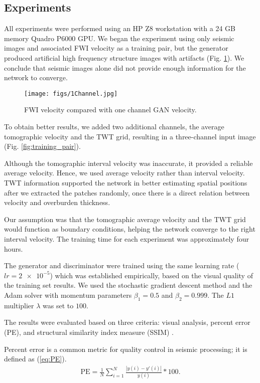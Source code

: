 \documentclass[conference]{IEEEtran}
\begin{document}
\subsection{Experiments}

All experiments were performed using an HP Z8 workstation with a 24 GB memory Quadro P6000 GPU.
We began the experiment using only seismic images and associated FWI velocity as a training pair, but the generator produced artificial high frequency structure images with artifacts (Fig.  \ref{fig:oneChanel}). We conclude that seismic images alone did not provide enough information for the network to converge.

\begin{figure}[b]
 \centering
 \texttt{[image: figs/1Channel.jpg]}
  \caption{FWI velocity compared with one channel GAN velocity.}
 \label{fig:oneChanel}
\end{figure}

To obtain better results, we added two additional channels, the average tomographic velocity and the TWT grid, resulting in a three-channel input image (Fig. \ref{fig:training_pair}).

Although the tomographic interval velocity was inaccurate, it provided a reliable average velocity. Hence, we used average velocity rather than interval velocity. TWT information supported the network in better estimating spatial positions after we extracted the patches randomly, once there is a direct relation between velocity and overburden thickness.

Our assumption was that the tomographic average velocity and the TWT grid would function as boundary conditions, helping the network converge to the right interval velocity.
The training time for each experiment was approximately four hours. 

The generator and discriminator were trained using the same learning rate ($lr =\num{2e-5}$) which was established empirically, based on the visual quality of the training set results. We used the stochastic gradient descent method and the Adam solver with momentum parameters $\beta_1=0.5$ and $\beta_2=0.999$. The $L1$ multiplier $\lambda$ was set to $100$.

The results were evaluated based on three criteria: visual analysis, percent error (PE), and structural similarity index measure (SSIM) \cite{Wang04SSIM}.

Percent error is a common metric for quality control in seismic processing; it is defined as (\ref{eq:PE}).
\begin{align}
     \mathrm{PE}  =\frac{1}{N}\sum_{i=1}^{N}\frac{ \left |y(i)-{y}'(i)  \right |}{y(i)}*100.
     \label{eq:PE}
\end{align}
\end{document}
